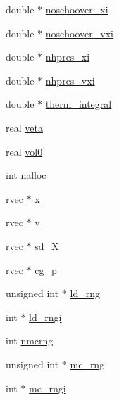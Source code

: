 \begin{DoxyCompactItemize}
\item 
double $\ast$ \hyperlink{structt__state_a6bdcf3562273ec92a293125ffecb948a}{nosehoover\-\_\-xi}
\item 
double $\ast$ \hyperlink{structt__state_a3277ad4d7078b5295a3d203f967eb656}{nosehoover\-\_\-vxi}
\item 
double $\ast$ \hyperlink{structt__state_a3162af22398dfda22b83c32116f11279}{nhpres\-\_\-xi}
\item 
double $\ast$ \hyperlink{structt__state_ab42d615831400eb6193fe2ee5ca83e09}{nhpres\-\_\-vxi}
\item 
double $\ast$ \hyperlink{structt__state_afc646d2151b51ed2f3057a12ac24cfff}{therm\-\_\-integral}
\item 
real \hyperlink{structt__state_ac87ef0747e2a870f11e2024ae273513c}{veta}
\item 
real \hyperlink{structt__state_adb58dcb5d04fcc2d958d4882c0f9f966}{vol0}
\item 
int \hyperlink{structt__state_ae1f9863f50d81a1885849adc0d78bd71}{nalloc}
\item 
\hyperlink{share_2template_2gromacs_2types_2simple_8h_aa02a552a4abd2f180c282a083dc3a999}{rvec} $\ast$ \hyperlink{structt__state_a21e458daf6d4ca8c285116060e6d7a8e}{x}
\item 
\hyperlink{share_2template_2gromacs_2types_2simple_8h_aa02a552a4abd2f180c282a083dc3a999}{rvec} $\ast$ \hyperlink{structt__state_a4ec5d976631759dc6752fa74a99a158d}{v}
\item 
\hyperlink{share_2template_2gromacs_2types_2simple_8h_aa02a552a4abd2f180c282a083dc3a999}{rvec} $\ast$ \hyperlink{structt__state_a25fd59a265b1a3e92fdb7e6dfed9b60b}{sd\-\_\-\-X}
\item 
\hyperlink{share_2template_2gromacs_2types_2simple_8h_aa02a552a4abd2f180c282a083dc3a999}{rvec} $\ast$ \hyperlink{structt__state_a37e14854bd63c61b6406d1b31993c4af}{cg\-\_\-p}
\item 
unsigned int $\ast$ \hyperlink{structt__state_a9da9715840dfa71686b2cdfd2b31f9b6}{ld\-\_\-rng}
\item 
int $\ast$ \hyperlink{structt__state_abe974399c070a4c5390356a3d11e473a}{ld\-\_\-rngi}
\item 
int \hyperlink{structt__state_ab796c969e52b559f9a1a56f6dd6ef59e}{nmcrng}
\item 
unsigned int $\ast$ \hyperlink{structt__state_a597887ba480b7d0c9240b3d5e0b406b7}{mc\-\_\-rng}
\item 
int $\ast$ \hyperlink{structt__state_afb1373e0e7eef94929430c01c84c69b1}{mc\-\_\-rngi}

\end{DoxyCompactItemize}
